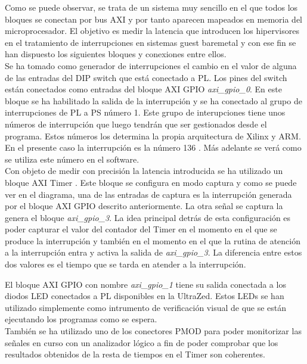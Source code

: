 Como se puede observar, se trata de un sistema muy sencillo en el que todos los bloques se conectan por bus AXI y por tanto aparecen mapeados en memoria del microprocesador. El objetivo es medir la latencia que introducen los hipervisores en el tratamiento de interrupciones en sistemas guest baremetal y con ese fin se han dispuesto los siguientes bloques y conexiones entre ellos.\\

Se ha tomado como generador de interrupciones el cambio en el valor de alguna de las entradas del \acrshort{DIP} switch que está conectado a \acrshort{PL}.
Los pines del switch están conectados como entradas del bloque \acrshort{AXI} \acrshort{GPIO} \cite{axi_gpio} \textit{axi\_gpio\_0}. En este bloque se ha habilitado la salida de la interrupción y se ha conectado al grupo de interrupciones de \acrshort{PL} a \acrshort{PS} número 1. Este grupo de interupciones tiene unos números de interrupción que luego tendrán que ser gestionados desde el programa. Estos números los determina la propia arquitectura de Xilinx y ARM. En el presente caso la interrupción es la número 136 \cite{axi_trm}. Más adelante se verá como se utiliza este número en el software.\\

Con objeto de medir con precisión la latencia introducida se ha utilizado un bloque \acrshort{AXI} Timer \cite{axi_timer}. Este bloque se configura en modo captura y como se puede ver en el diagrama, una de las entradas de captura es la interrupción generada por el bloque \acrshort{AXI} \acrshort{GPIO} descrito anteriormente. La otra señal se captura la genera el bloque \textit{axi\_gpio\_3}. La idea principal detrás de esta configuración es poder capturar el valor del contador del Timer en el momento en el que se produce la interrupción y también en el momento en el que la rutina de atención a la interrupción entra y activa la salida de \textit{axi\_gpio\_3}. La diferencia entre estos dos valores es el tiempo que se tarda en atender a la interrupción.

El bloque \acrshort{AXI} \acrshort{GPIO} con nombre \textit{axi\_gpio\_1} tiene su salida conectada a los diodos LED conectados a PL disponibles en la UltraZed. Estos LEDs se han utilizado simplemente como intrumento de verificación visual de que se están ejecutando los programas como se espera.\\

También se ha utilizado uno de los conectores PMOD para poder monitorizar las señales en curso con un analizador lógico a fin de poder comprobar que los resultados obtenidos de la resta de tiempos en el Timer son coherentes.\\

